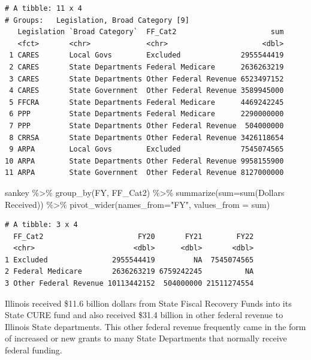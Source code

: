 \documentclass[
  letterpaper,
  DIV=11,
  numbers=noendperiod]{scrreport}
\newenvironment{Shaded}{\begin{snugshade}}{\end{snugshade}}
\newcommand{\AttributeTok}[1]{\textcolor[rgb]{0.40,0.45,0.13}{#1}}
\newcommand{\FunctionTok}[1]{\textcolor[rgb]{0.28,0.35,0.67}{#1}}
\newcommand{\NormalTok}[1]{\textcolor[rgb]{0.00,0.23,0.31}{#1}}
\newcommand{\SpecialCharTok}[1]{\textcolor[rgb]{0.37,0.37,0.37}{#1}}
\newcommand{\StringTok}[1]{\textcolor[rgb]{0.13,0.47,0.30}{#1}}
\begin{document}
\begin{verbatim}
# A tibble: 11 x 4
# Groups:   Legislation, Broad Category [9]
   Legislation `Broad Category`  FF_Cat2                      sum
   <fct>       <chr>             <chr>                      <dbl>
 1 CARES       Local Govs        Excluded              2955544419
 2 CARES       State Departments Federal Medicare      2636263219
 3 CARES       State Departments Other Federal Revenue 6523497152
 4 CARES       State Government  Other Federal Revenue 3589945000
 5 FFCRA       State Departments Federal Medicare      4469242245
 6 PPP         State Departments Federal Medicare      2290000000
 7 PPP         State Departments Other Federal Revenue  504000000
 8 CRRSA       State Departments Other Federal Revenue 3426118654
 9 ARPA        Local Govs        Excluded              7545074565
10 ARPA        State Departments Other Federal Revenue 9958155900
11 ARPA        State Government  Other Federal Revenue 8127000000
\end{verbatim}

\begin{Shaded}
\begin{Highlighting}[]
\NormalTok{sankey }\SpecialCharTok{\%\textgreater{}\%} 
  \FunctionTok{group\_by}\NormalTok{(FY, FF\_Cat2) }\SpecialCharTok{\%\textgreater{}\%} 
  \FunctionTok{summarize}\NormalTok{(}\AttributeTok{sum=}\FunctionTok{sum}\NormalTok{(}\StringTok{\textasciigrave{}}\AttributeTok{Dollars Received}\StringTok{\textasciigrave{}}\NormalTok{)) }\SpecialCharTok{\%\textgreater{}\%} 
  \FunctionTok{pivot\_wider}\NormalTok{(}\AttributeTok{names\_from=}\StringTok{"FY"}\NormalTok{, }\AttributeTok{values\_from =}\NormalTok{ sum)}
\end{Highlighting}
\end{Shaded}

\begin{verbatim}
# A tibble: 3 x 4
  FF_Cat2                      FY20       FY21        FY22
  <chr>                       <dbl>      <dbl>       <dbl>
1 Excluded               2955544419         NA  7545074565
2 Federal Medicare       2636263219 6759242245          NA
3 Other Federal Revenue 10113442152  504000000 21511274554
\end{verbatim}

Illinois received \$11.6 billion dollars from State Fiscal Recovery
Funds into its State CURE fund and also received \$31.4 billion in other
federal revenue to Illinois State departments. This other federal
revenue frequently came in the form of increased or new grants to many
State Departments that normally receive federal funding.
\end{document}
